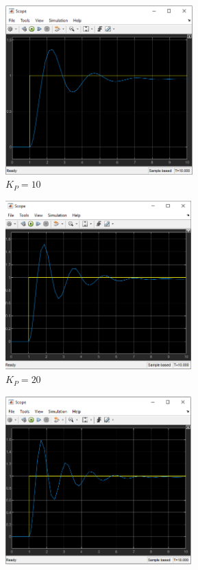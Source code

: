 \documentclass{article}
\begin{document}
		\begin{figure}[h]
			\begin{subfigure}{0.5\textwidth}
				\includegraphics[width=1\linewidth, height=6.5cm]{2_3c/10.png} 
				\caption{$K_P = 10$}
				\label{fig:KP_10}
			\end{subfigure}
			\begin{subfigure}{0.5\textwidth}
				\includegraphics[width=1\linewidth, height=6.5cm]{2_3c/20.png}
				\caption{$K_P = 20$}
				\label{fig:KP_20}
			\end{subfigure}
			\begin{subfigure}{0.5\textwidth}
				\includegraphics[width=1\linewidth, height=6.5cm]{2_3c/30.png} 

\end{subfigure}
\end{figure}
\end{document}
